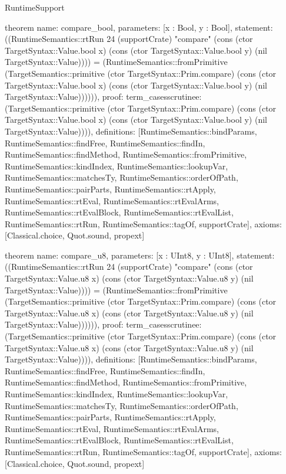 \begin{lexlean}{RuntimeSupport}
\begin{semanticmodule}
theorem{
  name: compare_bool,
  parameters: [x : Bool, y : Bool],
  statement: ((RuntimeSemantics::rtRun 24 (supportCrate) "compare" (cons (ctor TargetSyntax::Value.bool x) (cons (ctor TargetSyntax::Value.bool y) (nil TargetSyntax::Value)))) = (RuntimeSemantics::fromPrimitive (TargetSemantics::primitive (ctor TargetSyntax::Prim.compare) (cons (ctor TargetSyntax::Value.bool x) (cons (ctor TargetSyntax::Value.bool y) (nil TargetSyntax::Value)))))),
  proof: term_cases{scrutinee: (TargetSemantics::primitive (ctor TargetSyntax::Prim.compare) (cons (ctor TargetSyntax::Value.bool x) (cons (ctor TargetSyntax::Value.bool y) (nil TargetSyntax::Value)))), definitions: [RuntimeSemantics::bindParams, RuntimeSemantics::findFree, RuntimeSemantics::findIn, RuntimeSemantics::findMethod, RuntimeSemantics::fromPrimitive, RuntimeSemantics::kindIndex, RuntimeSemantics::lookupVar, RuntimeSemantics::matchesTy, RuntimeSemantics::orderOfPath, RuntimeSemantics::pairParts, RuntimeSemantics::rtApply, RuntimeSemantics::rtEval, RuntimeSemantics::rtEvalArms, RuntimeSemantics::rtEvalBlock, RuntimeSemantics::rtEvalList, RuntimeSemantics::rtRun, RuntimeSemantics::tagOf, supportCrate]},
  axioms: [Classical.choice, Quot.sound, propext]
}

theorem{
  name: compare_u8,
  parameters: [x : UInt8, y : UInt8],
  statement: ((RuntimeSemantics::rtRun 24 (supportCrate) "compare" (cons (ctor TargetSyntax::Value.u8 x) (cons (ctor TargetSyntax::Value.u8 y) (nil TargetSyntax::Value)))) = (RuntimeSemantics::fromPrimitive (TargetSemantics::primitive (ctor TargetSyntax::Prim.compare) (cons (ctor TargetSyntax::Value.u8 x) (cons (ctor TargetSyntax::Value.u8 y) (nil TargetSyntax::Value)))))),
  proof: term_cases{scrutinee: (TargetSemantics::primitive (ctor TargetSyntax::Prim.compare) (cons (ctor TargetSyntax::Value.u8 x) (cons (ctor TargetSyntax::Value.u8 y) (nil TargetSyntax::Value)))), definitions: [RuntimeSemantics::bindParams, RuntimeSemantics::findFree, RuntimeSemantics::findIn, RuntimeSemantics::findMethod, RuntimeSemantics::fromPrimitive, RuntimeSemantics::kindIndex, RuntimeSemantics::lookupVar, RuntimeSemantics::matchesTy, RuntimeSemantics::orderOfPath, RuntimeSemantics::pairParts, RuntimeSemantics::rtApply, RuntimeSemantics::rtEval, RuntimeSemantics::rtEvalArms, RuntimeSemantics::rtEvalBlock, RuntimeSemantics::rtEvalList, RuntimeSemantics::rtRun, RuntimeSemantics::tagOf, supportCrate]},
  axioms: [Classical.choice, Quot.sound, propext]
}


\end{semanticmodule}
\end{lexlean}

